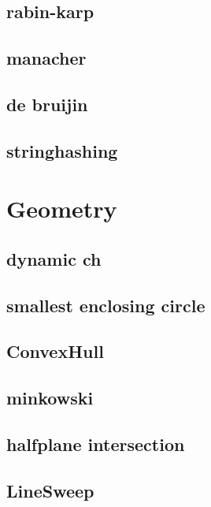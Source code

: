 \subsection{rabin-karp}
\raggedbottom
\hrulefill
\subsection{manacher}
\raggedbottom
\hrulefill
\subsection{de bruijin}
\raggedbottom
\hrulefill
\subsection{stringhashing}
\raggedbottom
\hrulefill

\section{Geometry}
\subsection{dynamic ch}
\raggedbottom
\hrulefill
\subsection{smallest enclosing circle}
\raggedbottom
\hrulefill
\subsection{ConvexHull}
\raggedbottom
\hrulefill
\subsection{minkowski}
\raggedbottom
\hrulefill
\subsection{halfplane intersection}
\raggedbottom
\hrulefill
\subsection{LineSweep}
\raggedbottom
\hrulefill
